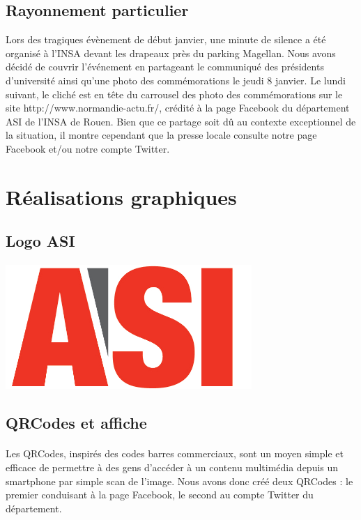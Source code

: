 \subsection{Rayonnement particulier}

Lors des tragiques évènement de début janvier, une minute de silence a été organisé à l'INSA devant les drapeaux près du parking Magellan. Nous avons décidé de couvrir l'événement en partageant le communiqué des présidents d'université ainsi qu'une photo des commémorations le jeudi 8 janvier. 
Le lundi suivant, le cliché est en tête du carrousel des photo des commémorations sur le site http://www.normandie-actu.fr/, crédité à la page Facebook du département ASI de l'INSA de Rouen.
Bien que ce partage soit dû au contexte exceptionnel de la situation, il montre cependant que la presse locale consulte notre page Facebook et/ou notre compte Twitter.

\section{Réalisations graphiques}
	\subsection{Logo ASI}

		\paragraph{}
		

		\begin{center}
			\includegraphics[width=0.7\textwidth]{images/logo.jpg}
		\end{center}

	\subsection{QRCodes et affiche}

		\paragraph{}
		Les QRCodes, inspirés des codes barres commerciaux, sont un moyen simple et efficace de permettre à des gens d'accéder à un contenu multimédia depuis un smartphone par simple scan de l'image. 
		Nous avons donc créé deux QRCodes : le premier conduisant à la page Facebook, le second au compte Twitter du département.
		
